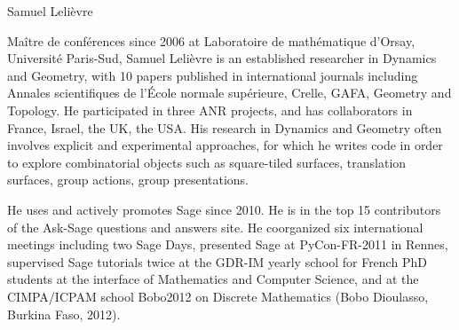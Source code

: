 \begin{participant}[type=R,PM=6,gender=male]{Samuel Lelièvre}

Maître de conférences since 2006 at
Laboratoire de mathématique d'Orsay, Université Paris-Sud,
Samuel Lelièvre is an established researcher in Dynamics and Geometry,
with 10 papers published in international journals including
Annales scientifiques de l'École normale supérieure,
Crelle, GAFA, Geometry and Topology.
He participated in three ANR projects, and has collaborators
in France, Israel, the UK, the USA.
His research in Dynamics and Geometry
often involves explicit and experimental approaches,
for which he writes code in order to explore
combinatorial objects such as square-tiled surfaces,
translation surfaces, group actions, group presentations.

He uses and actively promotes Sage since 2010.
He is in the top 15 contributors of the Ask-Sage
questions and answers site.
He coorganized six international meetings including two Sage Days,
presented Sage at PyCon-FR-2011 in Rennes,
supervised Sage tutorials twice at the GDR-IM yearly school
for French PhD students at the interface of Mathematics and
Computer Science, and at the CIMPA/ICPAM school Bobo2012
on Discrete Mathematics (Bobo Dioulasso, Burkina Faso, 2012).
\end{participant}
